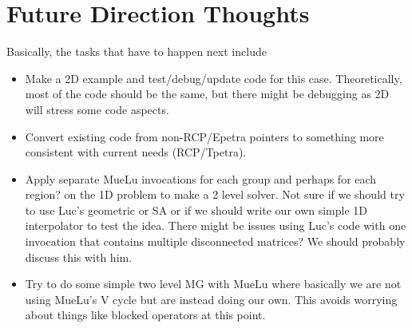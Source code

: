 \documentclass[11pt]{article}
\begin{document}
\section{Future Direction Thoughts}
Basically, the tasks that have to happen next include
\begin{itemize}
\item Make a 2D example and test/debug/update code for this case. Theoretically,
      most of the code should be the same, but there might be debugging
      as 2D will stress some code aspects.
\item Convert existing code from non-RCP/Epetra pointers to something
      more consistent with current needs (RCP/Tpetra).
\item Apply separate {\sf MueLu} invocations for each group and perhaps
      for each region? on the 1D problem to make a 2 level solver. Not sure
      if we should try to use
      Luc's geometric or SA or if we should write our own simple 1D interpolator
      to test the idea. There might be issues using Luc's code with one
      invocation that contains multiple disconnected matrices? We should
      probably discuss this with him.
\item Try to do some simple two level MG with {\sf MueLu} where basically we are
      not using MueLu's V cycle but are instead doing our own. This avoids
      worrying about things like blocked operators at this point.
\end{itemize}
\end{document}
